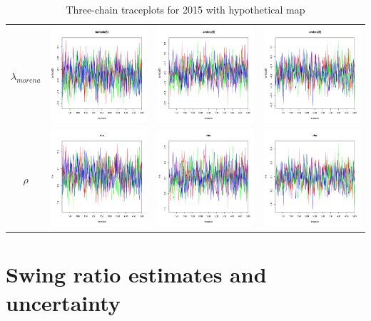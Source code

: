 \documentclass[letter,12pt]{article}
\begin{document}
\begin{table}
\begin{tabular}{cccc}
    $\lambda_{morena}$ & \includegraphics[width=.15\columnwidth]{../graphs/traceplots/2015d3v_6.pdf} &
                        \includegraphics[width=.15\columnwidth]{../graphs/traceplots/2015d3vbar_6.pdf} &
                         \includegraphics[width=.15\columnwidth]{../graphs/traceplots/2015d3wbar_6.pdf} \\
    $\rho$           & \includegraphics[width=.15\columnwidth]{../graphs/traceplots/2015d3v_7.pdf} &
                        \includegraphics[width=.15\columnwidth]{../graphs/traceplots/2015d3vbar_7.pdf} &
                         \includegraphics[width=.15\columnwidth]{../graphs/traceplots/2015d3wbar_7.pdf} \\
\end{tabular}
\caption{Three-chain traceplots for 2015 with hypothetical map}\label{T:traceplotEnd}
\end{table}

\section{Swing ratio estimates and uncertainty}
\end{document}

